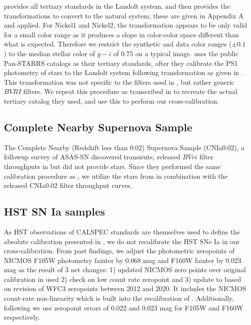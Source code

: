 \documentclass[twocolumn]{aastex63}
\newcommand{\blue}{\color{black}}
\begin{document}
 \cite{Ganeshalingam10} provides all tertiary standards in the Landolt system, and then provides the transformations to convert to the natural system; these are given in Appendix A and applied. For Nickel1 and Nickel2, the transformation appears to be only valid for a small color range as it produces a slope in color-color space different than what is expected. Therefore we restrict the synthetic and data color ranges ($\pm0.1$) to the median stellar color of $g-i$ of 0.75 on a typical image. \cite{KAIT-LOSS} uses the public Pan-STARRS catalogs as their tertiary standards, after they calibrate the PS1 photometry of stars to the Landolt system following transformation as given in \cite{Tonry12}.  This transformation was not specific to the filters used in \cite{KAIT-LOSS}, but rather generic $BVRI$ filters. We repeat this procedure as transcribed in \cite{KAIT-LOSS} to recreate the actual tertiary catalog they used, and use this to perform our cross-calibration.
 



\subsection{Complete Nearby Supernova Sample}
\label{sec:cnia}

{\blue The Complete Nearby (Redshift less than 0.02) Supernova Sample (CNIa0.02), a followup survey of ASAS-SN discovered transients, released $BVri$ filter throughputs in \cite{cnia0.02} but did not provide stars. Since they performed the same calibration procedure as \cite{KAIT-LOSS}, we utilize the stars from \cite{KAIT-LOSS} in combination with the released CNIa0.02 filter throughput curves.}

\subsection{HST SN Ia samples}
As HST observations of CALSPEC standards are themselves used to define the absolute calibration presented in \cite{Bohlin21}, we do not recalibrate the HST SNe Ia in our cross-calibration.  From past findings, we adjust the photometric zeropoints of NICMOS F105W photometry fainter by 0.068 mag and F160W fainter by 0.023 mag as the result of 3 net changes: 1) updated NICMOS zero points over original calibration in \cite{Riess07} used 2) \cite{Rubin15} check on low count rate zeropoint and 3) update to \cite{Rubin15} based on revision of WFC3 zeropoints between 2012 and 2020.  It includes the NICMOS count-rate non-linearity which is built into the recalibration of \cite{Rubin15}. Additionally, following \cite{Rubin15} we use zeropoint errors of 0.022 and 0.023 mag for F105W and F160W respectively.
\end{document}
